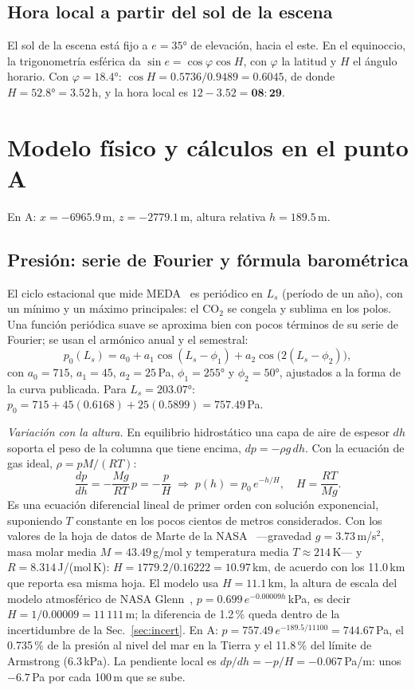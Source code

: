 \documentclass[conference]{IEEEtran}
\begin{document}
\subsection{Hora local a partir del sol de la escena}
El sol de la escena está fijo a $e = 35°$ de elevación, hacia el este. En el equinoccio, la trigonometría esférica da $\sin e = \cos\varphi\cos H$, con $\varphi$ la latitud y $H$ el ángulo horario. Con $\varphi = 18.4°$: $\cos H = 0.5736/0.9489 = 0.6045$, de donde $H = 52.8° = 3.52$\,h, y la hora local es $12 - 3.52 = \mathbf{08{:}29}$.

\section{Modelo físico y cálculos en el punto A}
En A: $x=-6965.9$\,m, $z=-2779.1$\,m, altura relativa $h=189.5$\,m.

\subsection{Presión: serie de Fourier y fórmula barométrica}
El ciclo estacional que mide MEDA~\cite{harri2024} es periódico en $L_s$ (período de un año), con un mínimo y un máximo principales: el CO$_2$ se congela y sublima en los polos. Una función periódica suave se aproxima bien con pocos términos de su serie de Fourier; se usan el armónico anual y el semestral:
\begin{equation}
p_0(L_s) = a_0 + a_1\cos(L_s-\phi_1) + a_2\cos\big(2(L_s-\phi_2)\big),
\end{equation}
con $a_0 = 715$, $a_1 = 45$, $a_2 = 25$\,Pa, $\phi_1 = 255°$ y $\phi_2 = 50°$, ajustados a la forma de la curva publicada. Para $L_s = 203.07°$: $p_0 = 715 + 45(0.6168) + 25(0.5899) = \mathbf{757.49}$\,Pa.

\emph{Variación con la altura.} En equilibrio hidrostático una capa de aire de espesor $dh$ soporta el peso de la columna que tiene encima, $dp = -\rho g\,dh$. Con la ecuación de gas ideal, $\rho = pM/(RT)$:
\begin{equation}
\frac{dp}{dh} = -\frac{Mg}{RT}\,p = -\frac{p}{H}\;\Rightarrow\; p(h) = p_0\, e^{-h/H},\quad H = \frac{RT}{Mg}.
\end{equation}
Es una ecuación diferencial lineal de primer orden con solución exponencial, suponiendo $T$ constante en los pocos cientos de metros considerados. Con los valores de la hoja de datos de Marte de la NASA~\cite{nasa_factsheet} ---gravedad $g = 3.73$\,m/s$^2$, masa molar media $M = 43.49$\,g/mol y temperatura media $T \approx 214$\,K--- y $R = 8.314$\,J/(mol\,K): $H = 1779.2/0.16222 = 10.97$\,km, de acuerdo con los 11.0\,km que reporta esa misma hoja. El modelo usa $H = 11.1$\,km, la altura de escala del modelo atmosférico de NASA Glenn~\cite{nasa_glenn}, $p = 0.699\,e^{-0.00009h}$\,kPa, es decir $H = 1/0.00009 = 11\,111$\,m; la diferencia de 1.2\,\% queda dentro de la incertidumbre de la Sec.~\ref{sec:incert}. En A:
$p = 757.49\, e^{-189.5/11100} = \mathbf{744.67}$\,Pa, el 0.735\,\% de la presión al nivel del mar en la Tierra y el 11.8\,\% del límite de Armstrong (6.3\,kPa). La pendiente local es $dp/dh = -p/H = -0.067$\,Pa/m: unos $-6.7$\,Pa por cada 100\,m que se sube.
\end{document}
